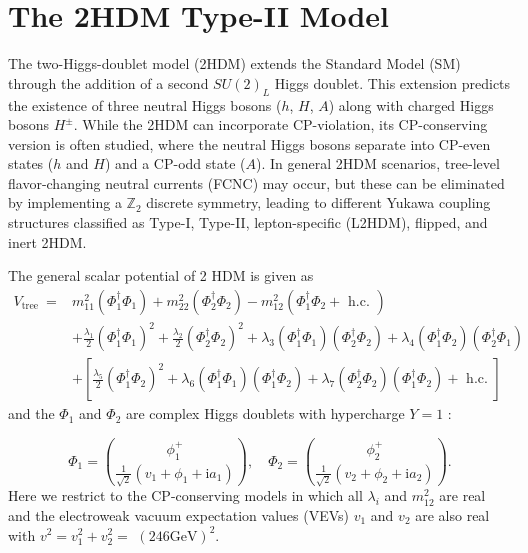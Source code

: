 \section{The 2HDM Type-II Model}
The two-Higgs-doublet model (2HDM) extends the Standard Model (SM) through the addition of a second $SU(2)_L$ Higgs doublet. This extension predicts the existence of three neutral Higgs bosons ($h$, $H$, $A$) along with charged Higgs bosons $H^{\pm}$. While the 2HDM can incorporate CP-violation, its CP-conserving version is often studied, where the neutral Higgs bosons separate into CP-even states ($h$ and $H$) and a CP-odd state ($A$). In general 2HDM scenarios, tree-level flavor-changing neutral currents (FCNC) may occur, but these can be eliminated by implementing a $\mathbb Z_2$ discrete symmetry, leading to different Yukawa coupling structures classified as Type-I, Type-II, lepton-specific (L2HDM), flipped, and inert 2HDM.

The general scalar potential of 2 HDM is given as
\begin{equation}
\begin{aligned}
V_{\text {tree }}= & m_{11}^2\left(\Phi_1^{\dagger} \Phi_1\right)+m_{22}^2\left(\Phi_2^{\dagger} \Phi_2\right)-m_{12}^2\left(\Phi_1^{\dagger} \Phi_2+\text { h.c. }\right) \\
& +\frac{\lambda_1}{2}\left(\Phi_1^{\dagger} \Phi_1\right)^2+\frac{\lambda_2}{2}\left(\Phi_2^{\dagger} \Phi_2\right)^2+\lambda_3\left(\Phi_1^{\dagger} \Phi_1\right)\left(\Phi_2^{\dagger} \Phi_2\right)+\lambda_4\left(\Phi_1^{\dagger} \Phi_2\right)\left(\Phi_2^{\dagger} \Phi_1\right) \\
& +\left[\frac{\lambda_5}{2}\left(\Phi_1^{\dagger} \Phi_2\right)^2+\lambda_6\left(\Phi_1^{\dagger} \Phi_1\right)\left(\Phi_1^{\dagger} \Phi_2\right)+\lambda_7\left(\Phi_2^{\dagger} \Phi_2\right)\left(\Phi_1^{\dagger} \Phi_2\right)+\text { h.c. }\right]
\end{aligned}    
\end{equation}
and the $\Phi_1$ and $\Phi_2$ are complex Higgs doublets with hypercharge $Y=1$ :

\begin{equation}
\Phi_1=\binom{\phi_1^{+}}{\frac{1}{\sqrt{2}}\left(v_1+\phi_1+\mathrm{i} a_1\right)}, \quad \Phi_2=\binom{\phi_2^{+}}{\frac{1}{\sqrt{2}}\left(v_2+\phi_2+\mathrm{i} a_2\right)} .    
\end{equation}
Here we restrict to the CP-conserving models in which all $\lambda_i$ and $m_{12}^2$ are real and the electroweak vacuum expectation values (VEVs) $v_1$ and $v_2$ are also real with $v^2=v_1^2+v_2^2=$ $(246 \mathrm{GeV})^2$.

